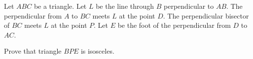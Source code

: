 Let $ABC$ be a triangle. Let $L$ be the line through $B$ perpendicular to $AB$. The perpendicular from $A$ to $BC$ meets $L$ at the point $D$. The perpendicular bisector of $BC$ meets $L$ at the point $P$. Let $E$ be the foot of the perpendicular from $D$ to $AC$.

Prove that triangle $BPE$ is isosceles.